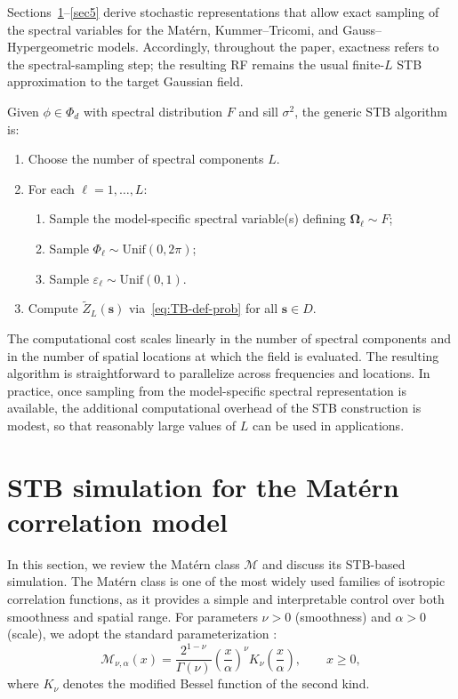 \documentclass[
  12pt]{article}
\begin{document}
Sections~\ref{sec3}--\ref{sec5} derive stochastic representations that allow exact sampling of the spectral variables for the Mat\'ern, Kummer--Tricomi, and Gauss--Hypergeometric models.
Accordingly, throughout the paper, exactness refers to the spectral-sampling step; the resulting RF remains the usual finite-$L$ STB approximation to the target Gaussian field.

Given $\phi\in\Phi_d$ with spectral distribution $F$ and sill $\sigma^2$, the generic STB algorithm is:
\begin{enumerate}
\item Choose the number of spectral components $L$.
\item For each $\ell=1,\dots,L$:
\begin{enumerate}
\item Sample the model-specific spectral variable(s) defining $\boldsymbol{\Omega}_\ell\sim F$;
\item Sample $\Phi_\ell\sim\mathrm{Unif}(0,2\pi)$;
\item Sample $\varepsilon_\ell\sim\mathrm{Unif}(0,1)$.
\end{enumerate}
\item Compute $\widetilde Z_L(\mathbf{s})$ via~\eqref{eq:TB-def-prob} for all $\mathbf{s}\in D$.
\end{enumerate}

The computational cost scales linearly in the number of spectral components and in the number of spatial locations at which the field is evaluated.
The resulting algorithm is straightforward to parallelize across frequencies and locations.
In practice, once sampling from the model-specific spectral representation is available, the additional computational overhead of the STB construction is modest, so that reasonably large values of $L$ can be used in applications.














\section{STB simulation for the Mat\'ern correlation model}
\label{sec3}

In this section, we review the Mat\'ern class $\mathcal{M}$ \citep{Stein:1999,mateporcu} and discuss its STB-based simulation.
The Mat\'ern class is one of the most widely used families of isotropic correlation functions, as it provides a simple and interpretable control over both smoothness and spatial range.
For parameters $\nu>0$ (smoothness) and $\alpha>0$ (scale), we adopt the standard parameterization \citep{Matern}:
\begin{equation}\label{eq:matern}
\mathcal{M}_{\nu,\alpha}(x)
= \frac{2^{1-\nu}}{\Gamma(\nu)}
\left(\frac{x}{\alpha}\right)^{\nu}
K_{\nu}\!\left(\frac{x}{\alpha}\right),
\qquad x \ge 0,
\end{equation}
where $K_{\nu}$ denotes the modified Bessel function of the second kind.
\end{document}
